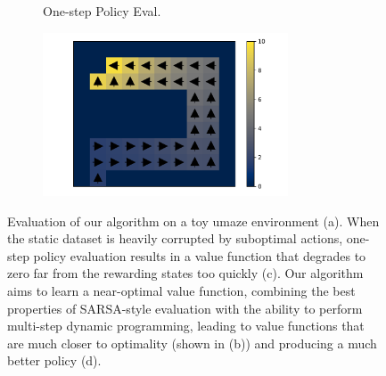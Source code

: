 \begin{figure}
\begin{subfigure}{0.235\textwidth}
    \caption{One-step Policy Eval.}
\end{subfigure}%
\begin{subfigure}{0.28\textwidth}
    \centering
    \includegraphics[width=0.8\textwidth]{iql/images/maze/maze_1.pdf}
    \caption{\ourname}
\end{subfigure}
\caption{Evaluation of our algorithm on a toy umaze environment (a).
When the static dataset is heavily corrupted by suboptimal actions, one-step policy evaluation
results in a value function that degrades to zero far from the rewarding states too quickly (c). Our algorithm aims to learn a near-optimal value function, combining the best properties of SARSA-style evaluation with the ability to perform multi-step dynamic programming, leading to value functions that are much closer to optimality (shown in (b)) and producing a much better policy (d).\label{fig:illustratiev}}
\end{figure}


